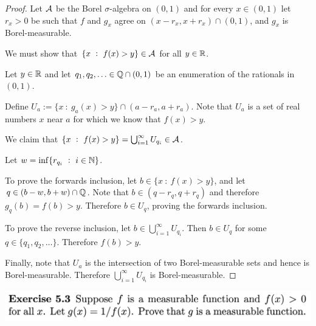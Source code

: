 \begin{proof}
  Let $\mathcal A$ be the Borel $\sigma$-algebra on $(0, 1)$ and for every $x \in (0, 1)$ let $r_x > 0$ be such
  that $f$ and $g_x$ agree on $(x - r_x, x + r_x) \cap (0, 1)$, and $g_x$ is Borel-measurable.

  We must show that $\{x ~:~ f(x) > y\} \in \mathcal A$ for all $y \in \mathbb{R}$.

  Let $y \in \mathbb{R}$ and let $q_1, q_2, \ldots \in \mathbb{Q} \cap (0, 1)$ be an enumeration of the rationals in $(0, 1)$.

  Define $U_{a} := \{x ~:~ g_{a}(x) > y\} \cap (a - r_{a}, a + r_{a})$. Note that $U_a$ is a set of real
  numbers $x$ near $a$ for which we know that $f(x) > y$.

  We claim that $\{x ~:~ f(x) > y\} = \bigcup_{i=1}^\infty U_{q_i} \in \mathcal A$.

  Let $w = \inf \{r_{q_i} ~:~ i \in \mathbb{N} \}$.

  To prove the forwards inclusion, let $b \in \{x ~:~ f(x) > y\}$, and let $q \in (b - w, b + w) \cap \mathbb{Q}$. Note
  that $b \in (q - r_q, q + r_q)$ and therefore $g_q(b) = f(b) > y$. Therefore $b \in U_q$, proving the
  forwards inclusion.

  To prove the reverse inclusion, let $b \in \bigcup_{i=1}^\infty U_{q_i}$. Then $b \in U_q$ for
  some $q \in \{q_1, q_2, \ldots\}$. Therefore $f(b) > y$.

  Finally, note that $U_a$ is the intersection of two Borel-measurable sets and hence is Borel-measurable.
  Therefore $\bigcup_{i=1}^\infty U_{q_i}$ is Borel-measurable.
\end{proof}



\newpage
\begin{mdframed}
\includegraphics[width=400pt]{img/analysis--berkeley-202a-hw06-b799.png}
\end{mdframed}

